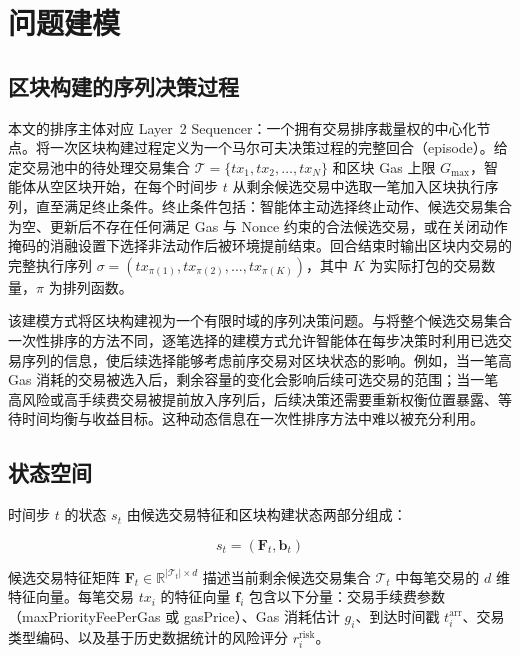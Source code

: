 
\section{问题建模}

\subsection{区块构建的序列决策过程}

本文的排序主体对应 Layer~2 Sequencer：一个拥有交易排序裁量权的中心化节点。将一次区块构建过程定义为一个马尔可夫决策过程的完整回合（episode）。给定交易池中的待处理交易集合 $\mathcal{T} = \{tx_1, tx_2, \ldots, tx_N\}$ 和区块 Gas 上限 $G_{\max}$，智能体从空区块开始，在每个时间步 $t$ 从剩余候选交易中选取一笔加入区块执行序列，直至满足终止条件。终止条件包括：智能体主动选择终止动作、候选交易集合为空、更新后不存在任何满足 Gas 与 Nonce 约束的合法候选交易，或在关闭动作掩码的消融设置下选择非法动作后被环境提前结束。回合结束时输出区块内交易的完整执行序列 $\sigma = (tx_{\pi(1)}, tx_{\pi(2)}, \ldots, tx_{\pi(K)})$，其中 $K$ 为实际打包的交易数量，$\pi$ 为排列函数。

该建模方式将区块构建视为一个有限时域的序列决策问题。与将整个候选交易集合一次性排序的方法不同，逐笔选择的建模方式允许智能体在每步决策时利用已选交易序列的信息，使后续选择能够考虑前序交易对区块状态的影响。例如，当一笔高 Gas 消耗的交易被选入后，剩余容量的变化会影响后续可选交易的范围；当一笔高风险或高手续费交易被提前放入序列后，后续决策还需要重新权衡位置暴露、等待时间均衡与收益目标。这种动态信息在一次性排序方法中难以被充分利用。

\subsection{状态空间}

时间步 $t$ 的状态 $s_t$ 由候选交易特征和区块构建状态两部分组成：

\begin{equation}
  s_t = (\mathbf{F}_t, \mathbf{b}_t)
\end{equation}

候选交易特征矩阵 $\mathbf{F}_t \in \mathbb{R}^{|\mathcal{T}_t| \times d}$ 描述当前剩余候选交易集合 $\mathcal{T}_t$ 中每笔交易的 $d$ 维特征向量。每笔交易 $tx_i$ 的特征向量 $\mathbf{f}_i$ 包含以下分量：交易手续费参数（maxPriorityFeePerGas 或 gasPrice）、Gas 消耗估计 $g_i$、到达时间戳 $t_i^{\text{arr}}$、交易类型编码、以及基于历史数据统计的风险评分 $r_i^{\text{risk}}$。

